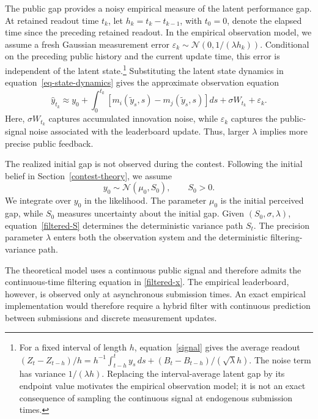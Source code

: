 \documentclass[mnsc]{informs3}
\begin{document}
{The public gap provides a noisy empirical measure of the latent performance gap. {At retained readout time $t_k$, let $h_k=t_k-t_{k-1}$, with $t_0=0$, denote the elapsed time since the preceding retained readout.} In the empirical observation model, we assume a fresh Gaussian measurement error $\varepsilon_k\sim\mathcal N(0,1/(\lambda h_k))$. Conditional on the preceding public history and the current update time, this error is independent of the latent state.\footnote{{\color{black}For a fixed interval of length $h$, equation~\eqref{signal} gives the average readout $(Z_t-Z_{t-h})/h=h^{-1}\int_{t-h}^t y_s\,ds+(B_t-B_{t-h})/(\sqrt\lambda h)$. The noise term has variance $1/(\lambda h)$. Replacing the interval-average latent gap by its endpoint value motivates the empirical observation model; it is not an exact consequence of sampling the continuous signal at endogenous submission times.}} Substituting the latent state dynamics in equation~\eqref{eq-state-dynamics} gives the approximate observation equation}
\begin{equation}\label{eq-leaderboard-gap}
\hat y_{t_k}
\approx
{y_0+\int_0^{t_k}\left[m_i(\tilde{y}_s,s)-m_j(\tilde{y}_s,s)\right]ds}
+\sigma W_{t_k}
+\varepsilon_k.
\end{equation}
Here, $\sigma W_{t_k}$ captures accumulated innovation noise, while $\varepsilon_k$ captures the public-signal noise associated with the leaderboard update.
Thus, larger $\lambda$ implies more precise public feedback.

{The realized initial gap is not observed during the contest. Following the initial belief in Section~\ref{contest-theory}, we assume}
\begin{equation}\label{eq-empirical-initial-state}
{y_0\sim\mathcal N\!\left(\mu_0,S_0\right),
\qquad S_0>0.}
\end{equation}
{We integrate over $y_0$ in the likelihood. The parameter $\mu_0$ is the initial perceived gap, while $S_0$ measures uncertainty about the initial gap. Given $(S_0,\sigma,\lambda)$, equation~\eqref{filtered-S} determines the deterministic variance path $S_t$.}
{The precision parameter $\lambda$ enters both the observation system and the deterministic filtering-variance path.}

The theoretical model uses a continuous public signal and therefore admits the continuous-time filtering equation in \eqref{filtered-x}. The empirical leaderboard, however, is observed only at asynchronous submission times. An exact empirical implementation would therefore require a hybrid filter with continuous prediction between submissions and discrete measurement updates.
\end{document}
